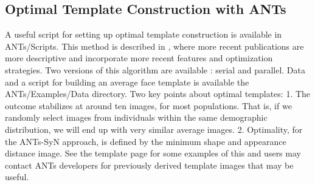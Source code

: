 \documentclass{InsightArticle}
\begin{document}
\subsection{Optimal Template Construction with ANTs}
A useful script for setting up optimal template construction
 is available in ANTs/Scripts.  This method is described in \cite{Avants2004,Avants2006d,Kim2008,Yushkevich2009,Avants2009c}, 
where more recent publications are more descriptive and incorporate 
more recent features and optimization strategies. 
Two versions of this algorithm are available : serial and parallel.  
Data and a script for building an average face template is available 
the ANTs/Examples/Data directory.  Two key points about optimal templates:
1. The outcome stabilizes at around ten images, for most populations.
That is, if we randomly select images from individuals within the same 
demographic distribution, we will end up with very similar average images.  
2.  Optimality, for the ANTs-SyN approach, is defined by the minimum shape 
and appearance distance image. 
See the template page for some examples of this and users may 
contact ANTs developers for previously derived template 
images that may be useful. 
\end{document}
